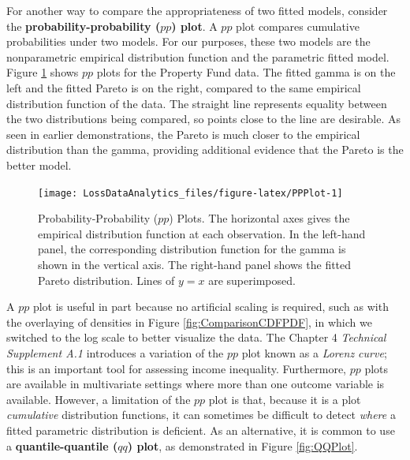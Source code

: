 \documentclass[]{book}
\theoremstyle{definition}
\theoremstyle{definition}
\theoremstyle{definition}
\theoremstyle{remark}
\begin{document}
For another way to compare the appropriateness of two fitted models,
consider the \textbf{probability-probability (\(pp\)) plot}. A \(pp\)
plot compares cumulative probabilities under two models. For our
purposes, these two models are the nonparametric empirical distribution
function and the parametric fitted model. Figure \ref{fig:PPPlot} shows
\(pp\) plots for the Property Fund data. The fitted gamma is on the left
and the fitted Pareto is on the right, compared to the same empirical
distribution function of the data. The straight line represents equality
between the two distributions being compared, so points close to the
line are desirable. As seen in earlier demonstrations, the Pareto is
much closer to the empirical distribution than the gamma, providing
additional evidence that the Pareto is the better model.

\begin{figure}

{\centering \texttt{[image: LossDataAnalytics\_files/figure-latex/PPPlot-1]} 

}

\caption{Probability-Probability ($pp$) Plots. The horizontal axes gives the empirical distribution function at each observation. In the left-hand panel, the corresponding distribution function for the gamma is shown in the vertical axis. The right-hand panel shows the fitted Pareto distribution. Lines of $y=x$ are superimposed.}\label{fig:PPPlot}
\end{figure}

A \(pp\) plot is useful in part because no artificial scaling is
required, such as with the overlaying of densities in Figure
\ref{fig:ComparisonCDFPDF}, in which we switched to the log scale to
better visualize the data. The Chapter 4 \emph{Technical Supplement A.1}
introduces a variation of the \(pp\) plot known as a \emph{Lorenz
curve}; this is an important tool for assessing income inequality.
Furthermore, \(pp\) plots are available in multivariate settings where
more than one outcome variable is available. However, a limitation of
the \(pp\) plot is that, because it is a plot \emph{cumulative}
distribution functions, it can sometimes be difficult to detect
\emph{where} a fitted parametric distribution is deficient. As an
alternative, it is common to use a \textbf{quantile-quantile (\(qq\))
plot}, as demonstrated in Figure \ref{fig:QQPlot}.
\end{document}
